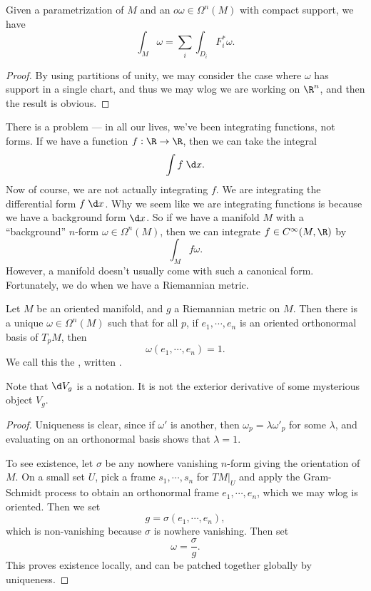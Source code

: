 \documentclass[a4paper]{article}
\begin{document}
\begin{thm}
  Given a parametrization of $M$ and an $o\omega \in \Omega^n(M)$ with compact support, we have
  \[
    \int_M \omega = \sum_i \int_{D_i} F_i^* \omega.
  \]
\end{thm}

\begin{proof}

  By using partitions of unity, we may consider the case where $\omega$ has support in a single chart, and thus we may wlog we are working on $\R^n$, and then the result is obvious.
\end{proof}

There is a problem --- in all our lives, we've been integrating functions, not forms. If we have a function $f: \R \to \R$, then we can take the integral
\[
  \int f\;\d x.
\]
Now of course, we are not actually integrating $f$. We are integrating the differential form $f\;\d x$. Why we seem like we are integrating functions is because we have a background form $\d x$. So if we have a manifold $M$ with a ``background'' $n$-form $\omega \in \Omega^n (M)$, then we can integrate $f \in C^\infty(M, \R)$ by
\[
  \int_M f \omega.
\]
However, a manifold doesn't usually come with such a canonical form. Fortunately, we do when we have a Riemannian metric.
\begin{lemma}
  Let $M$ be an oriented manifold, and $g$ a Riemannian metric on $M$. Then there is a unique $\omega \in \Omega^n(M)$ such that for all $p$, if $e_1, \cdots, e_n$ is an oriented orthonormal basis of $T_pM$, then
  \[
    \omega(e_1, \cdots, e_n) = 1.
  \]
  We call this the , written .
\end{lemma}
Note that $\d V_g$ is a notation. It is not the exterior derivative of some mysterious object $V_g$.

\begin{proof}
  Uniqueness is clear, since if $\omega'$ is another, then $\omega_p = \lambda \omega'_p$ for some $\lambda$, and evaluating on an orthonormal basis shows that $\lambda = 1$.

  To see existence, let $\sigma$ be any nowhere vanishing $n$-form giving the orientation of $M$. On a small set $U$, pick a frame $s_1, \cdots, s_n$ for $TM|_U$ and apply the Gram-Schmidt process to obtain an orthonormal frame $e_1, \cdots, e_n$, which we may wlog is oriented. Then we set
  \[
    g = \sigma(e_1, \cdots, e_n),
  \]
  which is non-vanishing because $\sigma$ is nowhere vanishing. Then set
  \[
    \omega = \frac{\sigma}{g}.
  \]
  This proves existence locally, and can be patched together globally by uniqueness.
\end{proof}
\end{document}
